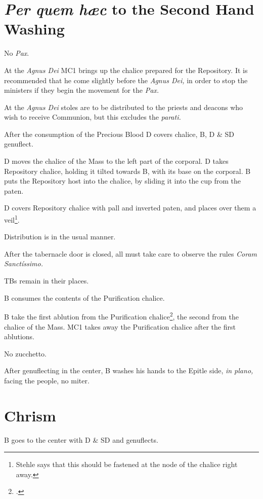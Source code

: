 {\section{\textit{Per quem hæc} to the Second Hand Washing}

\rubric No \textit{Pax}.

\rubric At the \textit{Agnus Dei} MC1 brings up the chalice prepared for the
Repository. It is recommended that he come slightly before the \textit{Agnus
Dei,} in order to stop the ministers if they begin the movement for the
\textit{Pax.}

\rubric At the \textit{Agnus Dei} stoles are to be distributed to the priests
and deacons who wish to receive Communion, but this excludes the
\textit{parati.}

\rubric After the consumption of the Precious Blood D covers chalice, B, D \&
SD genuflect. 

\rubric D moves the chalice of the Mass to the left part of the corporal. D
takes Repository chalice, holding it tilted towards B, with its base on the
corporal. B puts the Repository host into the chalice, by sliding it into the
cup from the paten.

\rubric D covers Repository chalice with pall and inverted paten, and places
over them a veil\footnote{Stehle says that this should be fastened at the node
of the chalice right away.}.

\rubric Distribution is in the usual manner.

\rubric After the tabernacle door is closed, all must take care to observe the
rules \textit{Coram Sanctíssimo.}

\rubric TBs remain in their places.

\rubric B consumes the contents of the Purification chalice.

\rubric B take the first ablution from the Purification
chalice\footcite[186]{stehle}, the second from the chalice of the Mass. MC1
takes away the Purification chalice after the first ablutions.

\rubric No zucchetto.

\rubric After genuflecting in the center, B washes his hands to the Epitle
side, \textit{in plano,} facing the people, no miter.

\section{Chrism}

\rubric B goes to the center with D \& SD and genuflects.

}
